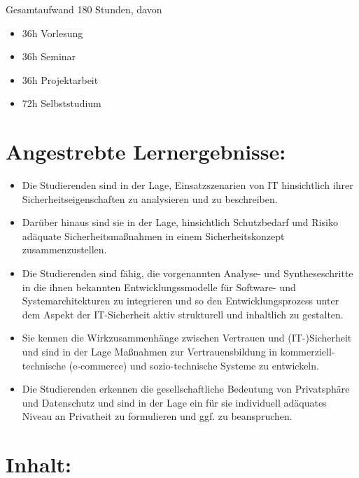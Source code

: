 Gesamtaufwand 180 Stunden, davon

\begin{itemize}
\tightlist
\item
  36h Vorlesung
\item
  36h Seminar
\item
  36h Projektarbeit
\item
  72h Selbststudium
\end{itemize}

\section*{Angestrebte
Lernergebnisse:\label{/mi-2017/modulbeschreibungen-master/MA_WTW_Modul_IT-Sicherheit}}\label{angestrebte-lernergebnissepathlabelmi-2017modulbeschreibungen-mastermaux5fwtwux5fmodulux5fit-sicherheit}

\begin{itemize}
\tightlist
\item
  Die Studierenden sind in der Lage, Einsatzszenarien von IT
  hinsichtlich ihrer Sicherheitseigenschaften zu analysieren und zu
  beschreiben.
\item
  Darüber hinaus sind sie in der Lage, hinsichtlich Schutzbedarf und
  Risiko adäquate Sicherheitsmaßnahmen in einem Sicherheitskonzept
  zusammenzustellen.
\item
  Die Studierenden sind fähig, die vorgenannten Analyse- und
  Syntheseschritte in die ihnen bekannten Entwicklungssmodelle für
  Software- und Systemarchitekturen zu integrieren und so den
  Entwicklungsprozess unter dem Aspekt der IT-Sicherheit aktiv
  strukturell und inhaltlich zu gestalten.
\item
  Sie kennen die Wirkzusammenhänge zwischen Vertrauen und
  (IT-)Sicherheit und sind in der Lage Maßnahmen zur Vertrauensbildung
  in kommerziell-technische (e-commerce) und sozio-technische Systeme zu
  entwickeln.
\item
  Die Studierenden erkennen die gesellschaftliche Bedeutung von
  Privatsphäre und Datenschutz und sind in der Lage ein für sie
  individuell adäquates Niveau an Privatheit zu formulieren und ggf. zu
  beanspruchen.
\end{itemize}

\section*{Inhalt:\label{/mi-2017/modulbeschreibungen-master/MA_WTW_Modul_IT-Sicherheit}}\label{inhaltpathlabelmi-2017modulbeschreibungen-mastermaux5fwtwux5fmodulux5fit-sicherheit}

